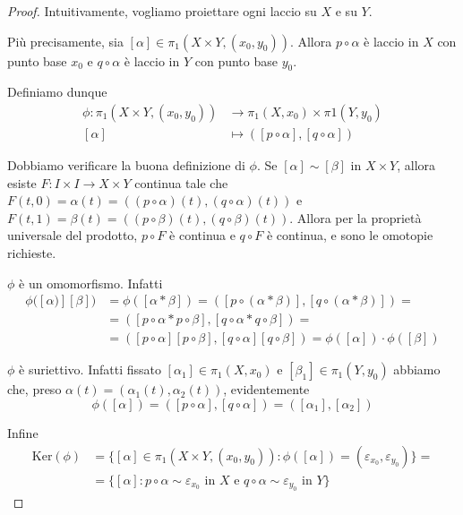 \begin{proof}
    Intuitivamente, vogliamo proiettare ogni laccio su \(X\) e su \(Y\).

    Più precisamente, sia \([\alpha] \in \pi_{1}{(X \times Y, {(x_{0},
    y_{0})})}\). Allora \(p \circ \alpha\) è laccio in \(X\) con punto base
    \(x_{0}\) e \(q \circ \alpha\) è laccio in \(Y\) con punto base \(y_{0}\).

    Definiamo dunque \begin{align*}
        \phi: \pi_{1}{(X \times  Y, {(x_{0}, y_{0})})} &\longrightarrow
        \pi_{1}(X, x_{0}) \times  \pi1{(Y, y_{0})} \\
        [\alpha] &\longmapsto {([p \circ \alpha], [q \circ \alpha])}
    \end{align*}

    Dobbiamo verificare la buona definizione di \(\phi\). Se \([\alpha] \sim
    [\beta]\) in \(X \times Y\), allora esiste \(F : I \times  I \to X \times  Y
    \) continua tale che \(F{(t, 0)} = \alpha{(t)} = {({(p \circ \alpha)}{(t)},
    {(q \circ \alpha)}{(t)})}\) e \(F{(t, 1)} = \beta{(t)} =
    {({(p \circ \beta)}{(t)}, {(q \circ \beta)}{(t)})}\). Allora per la
    proprietà universale del prodotto, \(p \circ F\) è continua e \(q \circ F\)
    è continua, e sono le omotopie richieste.

    \(\phi\) è un omomorfismo. Infatti
    \begin{align*}
        \phi{([\alpha)][\beta]}) &= \phi{([\alpha * \beta])} = 
        {([p \circ (\alpha * \beta)], [q \circ (\alpha * \beta)])} = \\
        &= {([p \circ \alpha * p \circ \beta], [q \circ \alpha * q \circ
        \beta])} = \\
        &= {([p \circ \alpha][p \circ \beta], [q \circ \alpha][q \circ \beta])}
        = \phi{([\alpha])} \cdot \phi{([\beta])}
    \end{align*}

    \(\phi\) è suriettivo. Infatti fissato \([\alpha_{1}] \in \pi_1{(X, x_{0})}\) e
    \([\beta_{1}] \in \pi_{1}{(Y, y_{0})}\) abbiamo che, preso \(\alpha{(t)} =
    {(\alpha_1{(t)}, \alpha_2{(t)})}\), evidentemente 
    \[
        \phi{([\alpha])} = {([p \circ \alpha], [q \circ \alpha])} =
        {([\alpha_1], [\alpha_2])}
    \]

    Infine 
    \begin{align*}
    \mathrm{Ker}(\phi) &= \{[\alpha] \in \pi_{1}{(X \times Y, {(x_{0}, y_{0})})}
    : \phi{([\alpha])} = {(\varepsilon_{x_{0}} , \varepsilon_{y_{0}} )}\} = \\
   &= \{[\alpha] : p\circ \alpha \sim \varepsilon_{x_{0}} \text{ in \(X\) e } q
   \circ \alpha \sim \varepsilon_{y_{0}} \text{ in \(Y\)}\} 
    \end{align*}


\end{proof}
